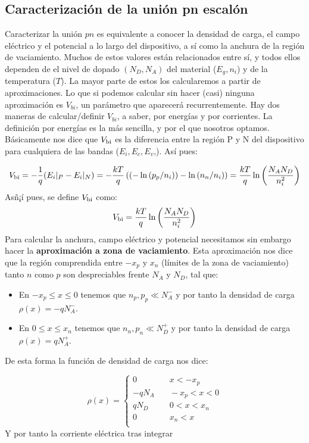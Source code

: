 \subsection{Caracterización de la unión pn escalón}

Caracterizar la unión $pn$ es equivalente a conocer la densidad de carga, el campo eléctrico y el potencial a lo largo del dispositivo, a sí como la anchura de la región de vaciamiento. Muchos de estos valores están relacionados entre sí, y todos ellos dependen de el nivel de dopado $(N_D,N_A)$ del material ($E_g,n_i$) y de la temperatura ($T$). La mayor parte de estos los calcularemos a partir de aproximaciones. Lo que si podemos calcular sin hacer (casi) ninguna aproximación es $V_{bi}$, un parámetro que aparecerá recurrentemente. Hay dos maneras de calcular/definir $V_{bi}$, a saber, por energías y por corrientes. La definición por energías es la más sencilla, y por el que nosotros optamos. Básicamente nos dice que $V_{\text{bi}}$ es la diferencia entre la región P y N del dispositivo para cualquiera de las bandas ($E_i,E_c,E_v$,). Así pues:

\begin{equation}
    V_{\text{bi}} = -\frac{1}{q}(E_i|_P - E_i|_ N) = -\frac{kT}{q} \left( \left( -\ln\left( p_p/n_i \right) \right)-\ln\left( n_n/n_i \right) \right) = \frac{kT}{q} \ln \left( \frac{N_AN_D}{n_i^2} \right)
\end{equation}
Asñ¡í pues, se define $V_{\text{bi}}$ como:
\begin{equation}
    V_{\text{bi}}= \frac{kT}{q} \ln \left( \frac{N_AN_D}{n_i^2} \right) 
\end{equation}
Para calcular la anchura, campo eléctrico y potencial necesitamos sin embargo hacer la \textbf{aproximación a zona de vaciamiento}. Esta aproximación nos dice que la región comprendida entre $-x_p$ y $x_n$ (límites de la zona de vaciamiento) tanto $n$ como $p$ son despreciables frente $N_A$ y $N_D$, tal que:

\begin{itemize}
    \item En $-x_p\leq x \leq 0$ tenemos que $n_p,p_p\ll N_A^-$ y por tanto la densidad de carga $\rho(x)=-qN_A^-$.
    \item  En $0\leq x \leq x_n$ tenemos que $n_n,p_n\ll N_D^+$ y por tanto la densidad de carga $\rho(x)=qN_A^+$.
\end{itemize}
De esta forma la función de densidad de carga nos dice: 

\begin{equation}
    \rho(x) = \left\lbrace \begin{array}{ll}
        0 & \quad x < -x_p \\
        -qN_A & \quad   -x_p< x < 0  \\
        qN_D & \quad 0< x < x_n \\
        0 & \quad x_n < x    \\
    \end{array} \right.
\end{equation}
Y por tanto la corriente eléctrica tras integrar

